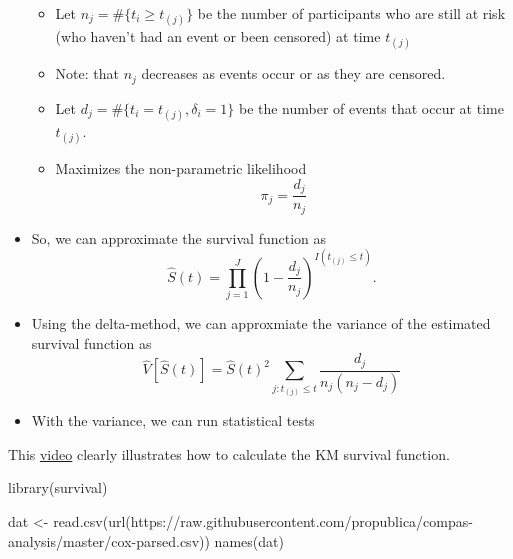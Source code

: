 \documentclass[
]{article}
\newenvironment{Shaded}{\begin{snugshade}}{\end{snugshade}}
\newcommand{\FunctionTok}[1]{\textcolor[rgb]{0.00,0.00,0.00}{#1}}
\newcommand{\NormalTok}[1]{#1}
\newcommand{\OtherTok}[1]{\textcolor[rgb]{0.56,0.35,0.01}{#1}}
\newcommand{\StringTok}[1]{\textcolor[rgb]{0.31,0.60,0.02}{#1}}
\begin{document}
\begin{itemize}
  \begin{itemize}
  \item
    Let \(n_j = \#\{t_i \geq t_{(j)}\}\) be the number of participants
    who are still at risk (who haven't had an event or been censored) at
    time \(t_{(j)}\)
  \item
    Note: that \(n_j\) decreases as events occur or as they are
    censored.
  \item
    Let \(d_j = \#\{t_i=t_{(j)}, \delta_i=1\}\) be the number of events
    that occur at time \(t_{(j)}\).
  \item
    Maximizes the non-parametric likelihood \[\pi_j = \frac{d_j}{n_j}\]
  \end{itemize}
\item
  So, we can approximate the survival function as \[
  \hat S(t) = \prod_{j=1}^J \left( 1-\frac{d_j}{n_j}\right)^{I(t_{(j)}\leq t)}.
  \]
\item
  Using the delta-method, we can approxmiate the variance of the
  estimated survival function as \[
  \hat V[\hat S(t)] = \hat S(t)^2 \sum_{j: t_{(j)}\leq t} \frac{d_j}{n_j(n_j-d_j)}
  \]
\item
  With the variance, we can run statistical tests
\end{itemize}

This \href{https://www.youtube.com/watch?v=NDgn72ynHcM}{video} clearly
illustrates how to calculate the KM survival function.

\begin{Shaded}
\begin{Highlighting}[]
\FunctionTok{library}\NormalTok{(survival)}

\NormalTok{dat }\OtherTok{\textless{}{-}} \FunctionTok{read.csv}\NormalTok{(}\FunctionTok{url}\NormalTok{(}\StringTok{\textquotesingle{}https://raw.githubusercontent.com/propublica/compas{-}analysis/master/cox{-}parsed.csv\textquotesingle{}}\NormalTok{))}
\FunctionTok{names}\NormalTok{(dat)}
\end{Highlighting}
\end{Shaded}
\end{document}
